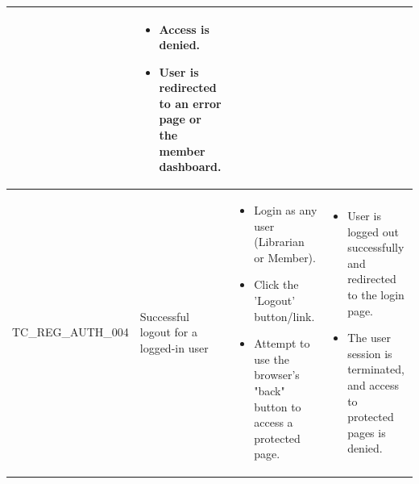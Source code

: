 \begin{longtable}{|>{\scriptsize\raggedright\arraybackslash}p{3cm}|>{\raggedright\arraybackslash}p{3.5cm}|>{\raggedright\arraybackslash}p{4.5cm}|>{\raggedright\arraybackslash}p{4.5cm}|}
\begin{itemize}[noitemsep, topsep=0pt, partopsep=0pt, leftmargin=*]
    \end{itemize} & 
    \begin{itemize}[noitemsep, topsep=0pt, partopsep=0pt, leftmargin=*]
        \item Access is denied.
        \item User is redirected to an error page or the member dashboard. 
    \end{itemize} \\ \hline
TC\_REG\_AUTH\_004 & Successful logout for a logged-in user & 
    \begin{itemize}[noitemsep, topsep=0pt, partopsep=0pt, leftmargin=*]
        \item Login as any user (Librarian or Member).
        \item Click the 'Logout' button/link. 
        \item Attempt to use the browser's "back" button to access a protected page.
    \end{itemize} & 
    \begin{itemize}[noitemsep, topsep=0pt, partopsep=0pt, leftmargin=*]
        \item User is logged out successfully and redirected to the login page. 
        \item The user session is terminated, and access to protected pages is denied. 
    \end{itemize} \\ \hline


\end{longtable}
